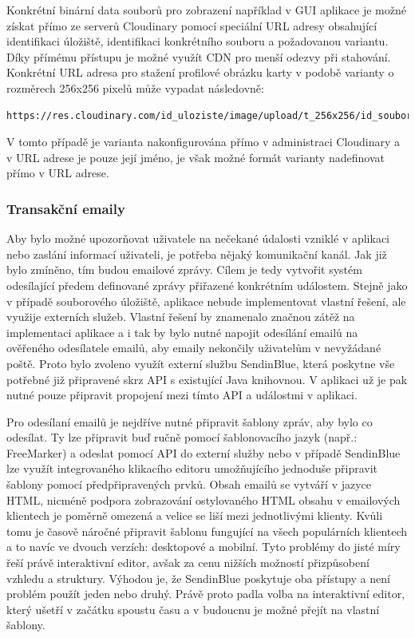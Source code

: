 		Konkrétní binární data souborů pro zobrazení například v \ac{GUI} aplikace je možné získat přímo ze serverů
		Cloudinary pomocí speciální \ac{URL} adresy obsahující identifikaci úložiště, identifikaci konkrétního souboru a
		požadovanou variantu.
		Díky přímému přístupu je možné využít \ac{CDN} pro menší odezvy při stahování.
		Konkrétní \ac{URL} adresa pro stažení profilové obrázku karty v podobě varianty o rozměrech 256x256 pixelů může
		vypadat následovně:
		\begin{lstlisting}
https://res.cloudinary.com/id_uloziste/image/upload/t_256x256/id_souboru
		\end{lstlisting}
		V tomto případě je varianta nakonfigurována přímo v administraci Cloudinary a v \ac{URL} adrese je pouze její jméno,
		je však možné formát varianty nadefinovat přímo v \ac{URL} adrese.

		\subsubsection{Transakční emaily}

		Aby bylo možné upozorňovat uživatele na nečekané údalosti vzniklé v aplikaci nebo zaslání informací uživateli,
		je potřeba nějaký komunikační kanál.
		Jak již bylo zmíněno, tím budou emailové zprávy.
		Cílem je tedy vytvořit systém odesílající předem definované zprávy přiřazené konkrétním událostem.
		Stejně jako v případě souborového úložiště, aplikace nebude implementovat vlastní řešení, ale využije externích
		služeb.
		Vlastní řešení by znamenalo značnou zátěž na implementaci aplikace a i tak by bylo nutné napojit odesílání
		emailů na ověřeného odesílatele emailů, aby emaily nekončily uživatelům v nevyžádané poště.
		Proto bylo zvoleno využít externí službu SendinBlue, která poskytne vše potřebné již připravené skrz \ac{API}
		s existující Java knihovnou.
		V aplikaci už je pak nutné pouze připravit propojení mezi tímto \ac{API} a událostmi v aplikaci.

		Pro odesílaní emailů je nejdříve nutné připravit šablony zpráv, aby bylo co odesílat.
		Ty lze připravit buď ručně pomocí šablonovacího jazyk (např.: FreeMarker) a odeslat pomocí \ac{API} do externí
		služby nebo v případě SendinBlue lze využít integrovaného klikacího editoru umožňujícího jednoduše připravit
		šablony pomocí předpřipravených prvků.
		Obsah emailů se vytváří v jazyce \ac{HTML}, nicméně podpora zobrazování ostylovaného \ac{HTML} obsahu v
		emailových klientech je poměrně omezená a velice se liší mezi jednotlivými klienty.
		Kvůli tomu je časově náročné připravit šablonu fungující na všech populárních klientech a to navíc ve dvouch
		verzích: desktopové a mobilní.
		Tyto problémy do jisté míry řeší právě interaktivní editor, avšak za cenu nižších možností přizpůsobení vzhledu
		a struktury.
		Výhodou je, že SendinBlue poskytuje oba přístupy a není problém použít jeden nebo druhý.
		Právě proto padla volba na interaktivní editor, který ušetří v začátku spoustu času a v budoucnu je možné
		přejít na vlastní šablony.

